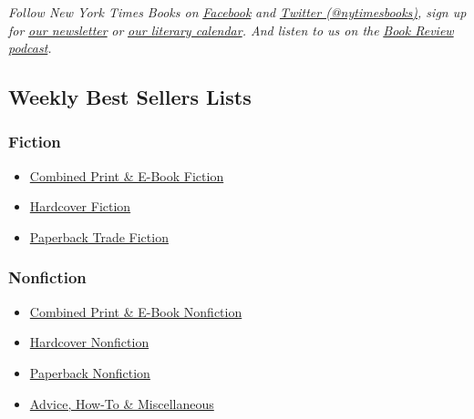 \emph{Follow New York Times Books on}
\href{https://www.facebookcorewwwi.onion/nytbooks/}{\emph{Facebook}}
\emph{and} \href{https://twitter.com/nytimesbooks}{\emph{Twitter
(@nytimesbooks)}}\emph{, sign up for}
\href{https://www.nytimes3xbfgragh.onion/newsletters/books-review}{\emph{our
newsletter}} \emph{or}
\href{https://www.nytimes3xbfgragh.onion/interactive/2017/books/books-calendar.html}{\emph{our
literary calendar}}\emph{. And listen to us on the}
\href{https://www.nytimes3xbfgragh.onion/column/book-review-podcast}{\emph{Book
Review podcast}}\emph{.}

\hypertarget{weekly-best-sellers-lists}{%
\subsection{Weekly Best Sellers Lists}\label{weekly-best-sellers-lists}}

\hypertarget{fiction}{%
\subsubsection{Fiction}\label{fiction}}

\begin{itemize}
\tightlist
\item
  \href{/books/best-sellers/combined-print-and-e-book-fiction/}{Combined
  Print \& E-Book Fiction}
\item
  \href{/books/best-sellers/hardcover-fiction/}{Hardcover Fiction}
\item
  \href{/books/best-sellers/trade-fiction-paperback/}{Paperback Trade
  Fiction}
\end{itemize}

\hypertarget{nonfiction}{%
\subsubsection{Nonfiction}\label{nonfiction}}

\begin{itemize}
\tightlist
\item
  \href{/books/best-sellers/combined-print-and-e-book-nonfiction/}{Combined
  Print \& E-Book Nonfiction}
\item
  \href{/books/best-sellers/hardcover-nonfiction/}{Hardcover Nonfiction}
\item
  \href{/books/best-sellers/paperback-nonfiction/}{Paperback Nonfiction}
\item
  \href{/books/best-sellers/advice-how-to-and-miscellaneous/}{Advice,
  How-To \& Miscellaneous}
\end{itemize}

